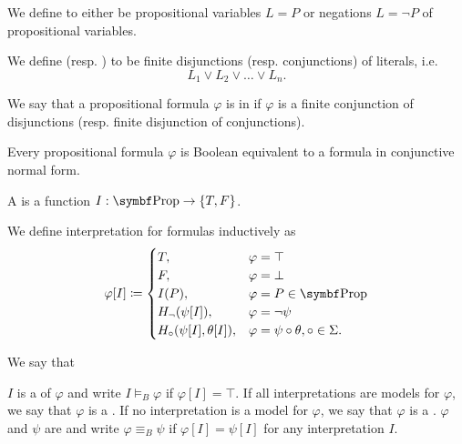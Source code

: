 \begin{definition}\label{def:conjunctive_normal_form}
  We define  to either be propositional variables \( L = P \) or negations \( L = \neg P \) of propositional variables.

  We define  (resp. ) to be finite disjunctions (resp. conjunctions) of literals, i.e.
  \begin{equation*}
    L_1 \lor L_2 \lor \ldots \lor L_n.
  \end{equation*}

  We say that a propositional formula \( \varphi \) is in  if \( \varphi \) is a finite conjunction of disjunctions (resp. finite disjunction of conjunctions).
\end{definition}

\begin{proposition}\label{thm:conjunctive_normal_form_reduction}
  Every propositional formula \( \varphi \) is Boolean equivalent to a formula in conjunctive normal form.
\end{proposition}

\begin{definition}\label{def:propositional_interpretation}
  A  is a function \( I: \Bold{Prop} \to \{ T, F \} \).

  We define interpretation for formulas inductively as
  \begin{align*}
    \varphi[I] \coloneqq \begin{cases}
      T,                           &\varphi = \top \\
      F,                           &\varphi = \bot \\
      I(P),                        &\varphi = P \in \Bold{Prop} \\
      H_\neg(\psi[I]),             &\varphi = \neg \psi         \\
      H_\circ(\psi[I], \theta[I]), &\varphi = \psi \circ \theta, \circ \in \Sigma.
    \end{cases}
  \end{align*}

  We say that
  \begin{defenum}
     \( I \) is a  of \( \varphi \) and write \( I \models_B \varphi \) if \( \varphi[I] = \top \).
     If all interpretations are models for \( \varphi \), we say that \( \varphi \) is a .
     If no interpretation is a model for \( \varphi \), we say that \( \varphi \) is a .
     \( \varphi \) and \( \psi \) are  and write \( \varphi \equiv_B \psi \) if \( \varphi[I] = \psi[I] \) for any interpretation \( I \).
  \end{defenum}
\end{definition}

